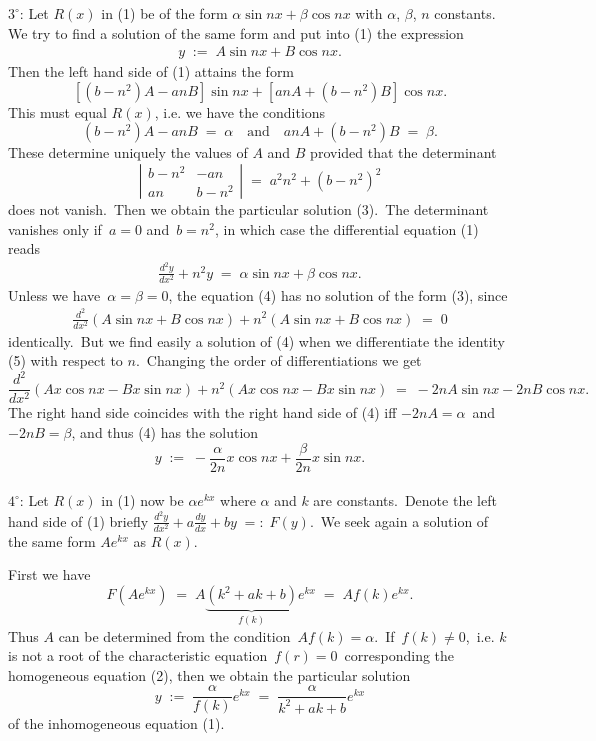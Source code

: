 \documentclass[12pt]{article}
\begin{document}
\textbf{$3^\circ$}\!:\; Let $R(x)$ in (1) be of the form 
$\alpha\sin{nx}+\beta\cos{nx}$ with $\alpha$, $\beta$, $n$ 
constants.\, We try to find a solution of the same form and put 
into (1) the expression
\begin{align}
y \;:=\; A\sin{nx}+B\cos{nx}.
\end{align}
Then the left hand side of (1) attains the form
$$[(b-n^2)A-anB]\sin{nx}+[anA+(b-n^2)B]\cos{nx}.$$
This must equal $R(x)$, i.e. we have the conditions
$$(b-n^2)A-anB \;=\; \alpha \quad \mbox{and} \quad anA+(b-n^2)B
\;=\; \beta.$$
These determine uniquely the values of $A$ and $B$ provided that
the determinant
$$
\left|\begin{matrix}
b\!-\!n^2 & -an\\
an & b\!-\!n^2
\end{matrix}\right|
\;=\; a^2n^2\!+\!(b\!-\!n^2)^2
$$
does not vanish.\, Then we obtain the particular solution (3).\,   
The determinant vanishes only if\, $a = 0$ and\, $b = n^2$, in 
which case the differential equation (1) reads
\begin{align}
      \frac{d^2y}{dx^2}+n^2y \;=\; \alpha\sin{nx}+\beta\cos{nx}.
\end{align}
Unless we have\, $\alpha = \beta = 0$, the equation (4) has no 
solution of the form (3), since
\begin{align}
\frac{d^2}{dx^2}(A\sin{nx}+B\cos{nx})+n^2(A\sin{nx}+B\cos{nx})
\;=\; 0
\end{align}
identically.\, But we find easily a solution of (4) when we 
differentiate the identity (5) with respect to $n$.\, Changing 
the order of differentiations we get 
$$\frac{d^2}{dx^2}(Ax\cos{nx}-Bx\sin{nx})
+n^2(Ax\cos{nx}-Bx\sin{nx}) \;=\; -2nA\sin{nx}-2nB\cos{nx}.$$
The right hand side coincides with the right hand side of 
(4) iff\; $-2nA = \alpha$\, and\, $-2nB = \beta$, and thus (4) 
has the solution
$$y \;:=\; 
-\frac{\alpha}{2n}x\cos{nx}+\frac{\beta}{2n}x\sin{nx}.$$\\


\textbf{$4^\circ$}\!:\;  Let $R(x)$ in (1) now be 
$\alpha e^{kx}$ where $\alpha$ and $k$ are constants.\, Denote 
the left hand side of (1) briefly
$\frac{d^2y}{dx^2}+a\frac{dy}{dx}+by \;=:\; F(y)$.\, We seek 
again a solution of the same form $Ae^{kx}$ as $R(x)$.

First we have
$$F(Ae^{kx}) \;=\; 
A\underbrace{(k^2\!+\!ak\!+\!b)}_{f(k)}e^{kx} 
\;=\; Af(k)e^{kx}.$$
Thus $A$ can be determined from the condition\, $Af(k) = 
\alpha$.\, If\, $f(k) \neq 0$,\, i.e. $k$ is not a root of the
characteristic equation\, $f(r) = 0$\, corresponding the 
homogeneous equation (2), then we obtain the 
particular solution
$$y \;:=\; \frac{\alpha}{f(k)}e^{kx} 
     \;=\; \frac{\alpha}{k^2\!+\!ak\!+\!b}e^{kx}$$
of the inhomogeneous equation (1).
\end{document}
